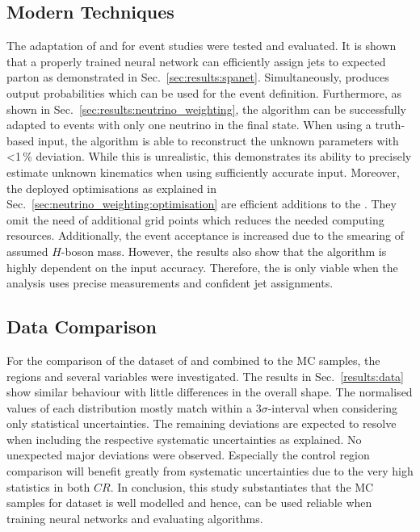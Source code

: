 \documentclass[bachelor,ngerman,english]{GAUBM}
\begin{document}
\subsection*{Modern Techniques}
The adaptation of \spanet and \NW for event studies were tested and evaluated. It is shown that a properly trained neural network can efficiently assign jets to expected parton as demonstrated in Sec.~\ref{sec:results:spanet}. Simultaneously, \spanet produces output probabilities which can be used for the event definition. Furthermore, as shown in Sec.~\ref{sec:results:neutrino_weighting}, the \NW algorithm can be successfully adapted to events with only one neutrino in the final state. When using a truth-based input, the algorithm is able to reconstruct the unknown parameters with <1\,\% deviation. While this is unrealistic, this demonstrates its ability to precisely estimate unknown kinematics when using sufficiently accurate input. Moreover, the deployed optimisations as explained in Sec.~\ref{sec:neutrino_weighting:optimisation} are efficient additions to the \NW. They omit the need of additional grid points which reduces the needed computing resources. Additionally, the event acceptance is increased due to the smearing of assumed $H$-boson mass. However, the results also show that the algorithm is highly dependent on the input accuracy. Therefore, the \NW is only viable when the analysis uses precise measurements and confident jet assignments. 

\subsection*{Data Comparison}
For the comparison of the \atlas dataset of \runi and \runii combined to the MC samples, the regions and several variables were investigated. The results in Sec.~\ref{results:data} show similar behaviour with little differences in the overall shape. The normalised values of each distribution mostly match within a $3\sigma$-interval when considering only statistical uncertainties. The remaining deviations are expected to resolve when including the respective systematic uncertainties as explained. No unexpected major deviations were observed. Especially the control region comparison will benefit greatly from systematic uncertainties due to the very high statistics in both $CR$. In conclusion, this study substantiates that the MC samples for \atlas dataset is well modelled and hence, can be used reliable when training neural networks and evaluating algorithms.
\end{document}
